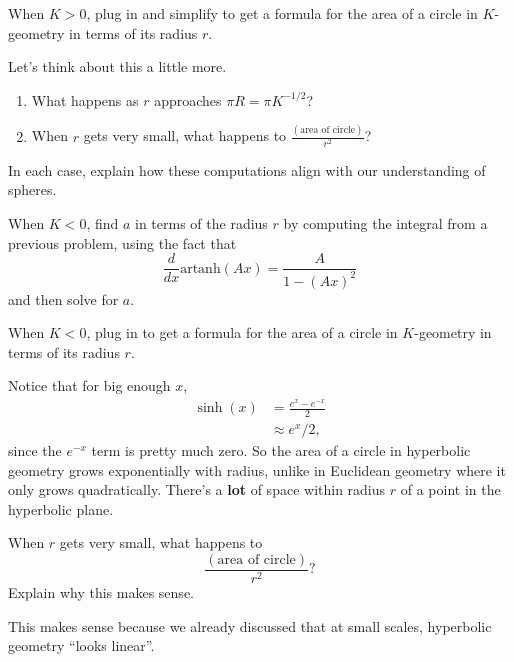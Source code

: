 \documentclass[newpage,handout,hints,12pt,noauthor,nooutcomes]{ximera}
\begin{document}
\begin{problem}
  When $K>0$, plug in and simplify to get a formula for the area of a circle in
  $K$-geometry in terms of its radius $r$.
\end{problem}

\begin{problem}
  Let's think about this a little more.
  \begin{enumerate}
  \item What happens as $r$ approaches $\pi R=\pi K^{-1/2}$?
  \item When $r$ gets very small, what happens to $\frac{(\text{area of circle})}{r^2}$?
  \end{enumerate}
  In each case, explain how these computations align with our understanding of spheres.
\end{problem}

\begin{problem}
  When $K<0$, find $a$ in terms of the radius $r$ by computing the
  integral from a previous problem, using the fact that
  \[
  \frac{d}{dx}\mathrm{artanh}(Ax)=\frac{A}{1-(Ax)^2}
  \]
  and then solve for $a$.

\end{problem}

\begin{problem}
  When $K<0$, plug in to get a formula for the area of a circle in $K$-geometry
  in terms of its radius $r$.
\end{problem}

Notice that for big enough $x$,
\begin{align*}
\sinh(x) &= \frac{e^x-e^{-x}}{2}\\
&\approx e^x/2,
\end{align*}
since the $e^{-x}$ term is pretty much zero.  So the area of a circle
in hyperbolic geometry grows exponentially with radius, unlike in
Euclidean geometry where it only grows quadratically.  There's a
\textbf{lot} of space within radius $r$ of a point in the hyperbolic
plane.


\begin{problem}
  When $r$ gets very small, what happens to
  \[
  \frac{(\text{area of circle})}{r^2}?
  \]
  Explain why this makes sense.
  \begin{freeResponse}
    This makes sense because we already discussed that at small scales,
    hyperbolic geometry ``looks linear''.
  \end{freeResponse}
\end{problem}
\end{document}
